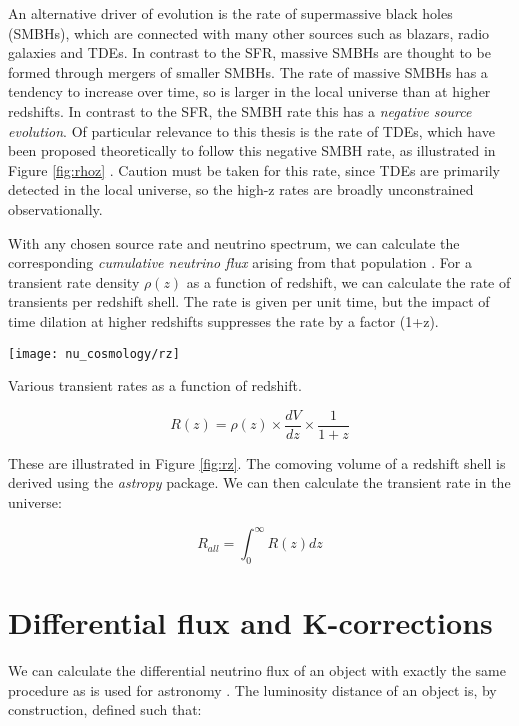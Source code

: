 An alternative driver of evolution is the rate of supermassive black holes (SMBHs), which are connected with many other sources such as blazars, radio galaxies and TDEs. In contrast to the SFR, massive SMBHs are thought to be formed through mergers of smaller SMBHs. The rate of massive SMBHs has a tendency to increase over time, so is larger in the local universe than at higher redshifts. In contrast to the SFR, the SMBH rate this has a \emph{negative source evolution}. Of particular relevance to this thesis is the rate of TDEs, which have been proposed theoretically to follow this negative SMBH rate, as illustrated in Figure \ref{fig:rhoz} . Caution must be taken for this rate, since TDEs are primarily detected in the local universe, so the high-z rates are broadly unconstrained observationally.

With any chosen source rate and neutrino spectrum, we can calculate the corresponding \emph{cumulative neutrino flux} arising from that population \cite{Strotjohann2020Search}. For a transient rate density $\rho (z)$ as a function of redshift, we can calculate the rate of transients per redshift shell. The rate is given per unit time, but the impact of time dilation at higher redshifts suppresses the rate by a factor (1+z). 

\begin{marginfigure}
	\centering \texttt{[image: nu\_cosmology/rz]}
	\caption{Various transient rates as a function of redshift.}
	\label{fig:rz}
\end{marginfigure}

\begin{equation}
R(z) = \rho(z) \times \frac{dV}{dz} \times \frac{1}{1+z}
\end{equation}

These are illustrated in Figure \ref{fig:rz}. The comoving volume of a redshift shell is derived using the \emph{astropy} package. We can then calculate the transient rate in the universe:

\begin{equation}
R_{all} = \int_{0}^{\infty} R(z) dz
\end{equation}

\section{Differential flux and K-corrections}

We can calculate the differential neutrino flux of an object with exactly the same procedure as is used for astronomy . The luminosity distance of an object is, by construction, defined such that:

